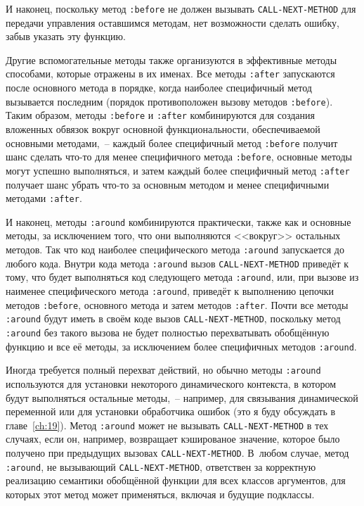 И наконец, поскольку метод \lstinline{:before} не должен вызывать \lstinline{CALL-NEXT-METHOD} для
передачи управления оставшимся методам, нет возможности сделать ошибку, забыв указать эту
функцию.

Другие вспомогательные методы также организуются в эффективные методы способами, которые
отражены в их именах.  Все методы \lstinline{:after} запускаются после основного метода в
порядке, когда наиболее специфичный метод вызывается последним (порядок противоположен
вызову методов \lstinline{:before}).  Таким образом, методы \lstinline{:before} и \lstinline{:after}
комбинируются для создания вложенных обвязок вокруг основной функциональности,
обеспечиваемой основными методами,~-- каждый более специфичный метод \lstinline{:before} получит
шанс сделать что-то для менее специфичного метода \lstinline{:before}, основные методы могут
успешно выполняться, и затем каждый более специфичный метод \lstinline{:after} получает шанс
убрать что-то за основным методом и менее специфичными методами \lstinline{:after}.

И наконец, методы \lstinline{:around} комбинируются практически, также как и основные
методы, за исключением того, что они выполняются <<вокруг>> остальных методов. Так что код
наиболее специфического метода \lstinline{:around} запускается до любого кода. Внутри кода
метода \lstinline{:around} вызов \lstinline{CALL-NEXT-METHOD} приведёт к тому, что будет
выполняться код сле\-дую\-ще\-го метода \lstinline{:around}, или, при вызове из наименее
специфического метода \lstinline{:around}, приведёт к выполнению цепочки методов
\lstinline{:before}, основного метода и затем методов \lstinline{:after}.  Почти все
методы \lstinline{:around} будут иметь в своём коде вызов \lstinline{CALL-NEXT-METHOD},
поскольку метод \lstinline{:around} без такого вызова не будет полностью перехватывать
обобщённую функцию и все её методы, за исключением более специфичных методов
\lstinline{:around}.

Иногда требуется полный перехват действий, но обычно методы \lstinline{:around} используются
для установки некоторого динамического контекста, в котором будут выполняться остальные
методы,~-- например, для связывания динамической переменной или для установки обработчика
ошибок (это я буду обсуждать в главе~\ref{ch:19}).  Метод \lstinline{:around} может не вызывать
\lstinline{CALL-NEXT-METHOD} в тех случаях, если он, например, возвращает кэшированое значение,
которое было получено при предыдущих вызовах \lstinline{CALL-NEXT-METHOD}.  В~любом случае,
метод \lstinline{:around}, не вызывающий \lstinline{CALL-NEXT-METHOD}, ответствен за корректную
реа\-ли\-за\-цию семантики обобщённой функции для всех классов аргументов, для которых этот
метод может применяться, включая и будущие подклассы.

